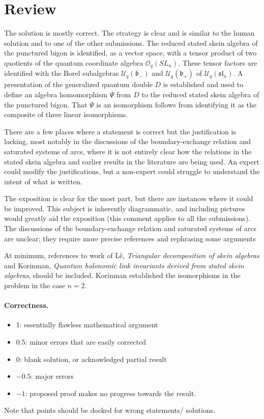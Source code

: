 \documentclass[11pt]{article}
\theoremstyle{remark}
\begin{document}
\maketitle

\section{Review}

The solution is mostly correct. The strategy is clear and is similar to the human solution and to one of the other submissions. The reduced stated skein algebra of the punctured bigon is identified, as a vector space, with a tensor product of two quotients of the quantum coordinate algebra $\mathcal{O}_q(SL_n)$. These tensor factors are identified with the Borel subalgebras $\mathcal{U}_q(\mathfrak{b}_-)$ and $\mathcal{U}_q(\mathfrak{b}_+)$ of  $\mathcal{U}_q(\mathfrak{sl}_n)$. A presentation of the generalized quantum double $D$ is established and used to define an algebra homomorphism $\Psi$ from $D$ to  the reduced stated skein algebra of the punctured bigon. That $\Psi$ is an isomorphism follows from identifying it as the composite of three linear isomorphisms.

There are a few places where a statement is correct but the justification is lacking, most notably in the discussions of the boundary-exchange relation and saturated systems of arcs, where it is not entirely clear how the relations in the stated skein algebra and earlier results in the literature are being used. An expert could modify the justifications, but a non-expert could struggle to understand the intent of what is written.

The exposition is clear for the most part, but there are instances where it could be improved. This subject is inherently diagrammatic, and including pictures would greatly aid the exposition (this comment applies to all the submissions). The discussions of the boundary-exchange relation and saturated systems of arcs are unclear; they require more precise references and rephrasing some arguments 

At minimum, references to work of L\^e,
\emph{Triangular decomposition of skein algebras} and Korinman,
\emph{Quantum holonomic link invariants derived from stated skein
algebras}, should be included. Korinman established the isomorphisms in the problem in the case $n=2$. 


\paragraph{Correctness.}
\begin{itemize}
	\item  1: essentially flawless mathematical argument
	\item  0.5: minor errors that are easily corrected
	\item  0: blank solution, or acknowledged partial result
	\item  $-0.5$: major errors
	\item  $-1$: proposed proof makes no progress towards the result.
\end{itemize}
Note that points should be docked for wrong statements/ solutions.
\end{document}
